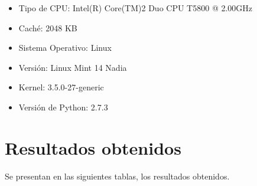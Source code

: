 \documentclass[a4paper,12pt]{report}
\begin{document}
\begin{itemize}
 \item Tipo de CPU: Intel(R) Core(TM)2 Duo CPU T5800 @ 2.00GHz
 \item Caché: 2048 KB
 \item Sistema Operativo: Linux
 \item Versión: Linux Mint 14 Nadia
 \item Kernel: 3.5.0-27-generic
 \item Versión de Python: 2.7.3
\end{itemize}

\section{Resultados obtenidos}
Se presentan en las siguientes tablas, los resultados obtenidos.
\end{document}
